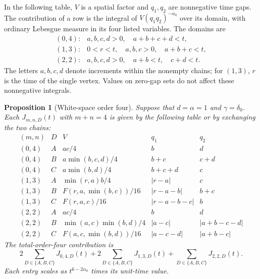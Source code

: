 \documentclass[12pt,oneside,openany]{book}
\makeatletter
\let\lean@pending\@empty
\newcommand{\LeanMarker}[1]{\gdef\lean@pending{#1}}
\numberwithin{equation}{section}
\newtheorem{proposition}[theorem]{Proposition}
\theoremstyle{nogostyle}
\theoremstyle{definition}
\makeatother
\begin{document}
In the following table, $V$ is a spatial factor and $q_1,q_2$ are nonnegative
time gaps. The contribution of a row is the integral of $V(q_1q_2)^{-\alpha_0}$
over its domain, with ordinary Lebesgue measure in its four listed variables.
The domains are
\[
  \begin{array}{ll}
    (0,4):&a,b,c,d>0,\quad a+b+c+d<t,\\
    (1,3):&0<r<t,\quad a,b,c>0,\quad a+b+c<t,\\
    (2,2):&a,b,c,d>0,\quad a+b<t,\quad c+d<t.
  \end{array}
\]
The letters $a,b,c,d$ denote increments within the nonempty chains; for $(1,3)$,
$r$ is the time of the single vertex. Values on zero-gap sets do not affect
these nonnegative integrals.

\LeanMarker{P:white-four}
\begin{proposition}[White-space order four]\label{P:white-four}
  Suppose that $d = \alpha = 1$ and $\gamma = \delta_0$. Each $J_{m,n,D}(t)$
  with $m+n = 4$ is given by the following table or by exchanging the two
  chains:
  \begin{equation}\label{E:white-four-table}
    \begin{array}{c|c|c|c|c}
      (m,n)&D&V&q_1&q_2\\ \hline
      (0,4)&A&ac/4&b&d\\
      (0,4)&B&a\min(b,c,d)/4&b+c&c+d\\
      (0,4)&C&a\min(b,d)/4&b+c+d&c\\ \hline
      (1,3)&A&\min(r,a)b/4&|r-a|&c\\
      (1,3)&B&F(r,a,\min(b,c))/16&|r-a-b|&b+c\\
      (1,3)&C&F(r,a,c)/16&|r-a-b-c|&b\\ \hline
      (2,2)&A&ac/4&b&d\\
      (2,2)&B&\min(a,c)\min(b,d)/4&|a-c|&|a+b-c-d|\\
      (2,2)&C&F(a,c,\min(b,d))/16&|a-c-d|&|a+b-c|
    \end{array}
  \end{equation}
  The total-order-four contribution is
  \begin{equation}\label{E:total-four}
    2\sum_{D\in\{A,B,C\}}J_{0,4,D}(t)
    +2\sum_{D\in\{A,B,C\}}J_{1,3,D}(t)
    +\sum_{D\in\{A,B,C\}}J_{2,2,D}(t).
  \end{equation}
  Each entry scales as $t^{6-2\alpha_0}$ times its unit-time value.
\end{proposition}
\end{document}
